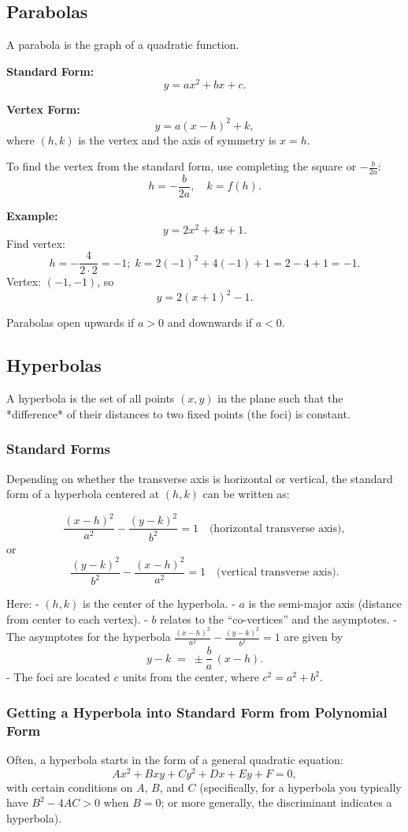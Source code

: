 \documentclass{article}
\begin{document}
\begin{multicols}{2}
\section*{Parabolas}
A parabola is the graph of a quadratic function.

\textbf{Standard Form:}
\[
y=ax^2+bx+c.
\]

\textbf{Vertex Form:}
\[
y=a(x-h)^2 + k,
\]
where \((h,k)\) is the vertex and the axis of symmetry is \(x=h\).

To find the vertex from the standard form, use completing the square or \(-\frac{b}{2a}\):
\[
h = -\frac{b}{2a}, \quad k = f(h).
\]

\textbf{Example:}
\[
y=2x^2+4x+1.
\]
Find vertex:
\[
h=-\frac{4}{2\cdot2}=-1; \; k=2(-1)^2+4(-1)+1=2-4+1=-1.
\]
Vertex: \((-1,-1)\), so
\[
y=2(x+1)^2 -1.
\]

Parabolas open upwards if \(a>0\) and downwards if \(a<0\).
\subsection*{Hyperbolas}

A hyperbola is the set of all points \((x,y)\) in the plane such that the *difference* of their distances to two fixed points (the foci) is constant. 

\subsubsection*{Standard Forms}

Depending on whether the transverse axis is horizontal or vertical, the standard form of a hyperbola centered at \((h,k)\) can be written as:

\[
\frac{(x - h)^2}{a^2} - \frac{(y - k)^2}{b^2} = 1 
\quad\text{(horizontal transverse axis)},
\]
or
\[
\frac{(y - k)^2}{b^2} - \frac{(x - h)^2}{a^2} = 1 
\quad\text{(vertical transverse axis)}.
\]

Here:
- \((h,k)\) is the center of the hyperbola.
- \(a\) is the semi-major axis (distance from center to each vertex).
- \(b\) relates to the “co-vertices” and the asymptotes.
- The asymptotes for the hyperbola 
  \(\tfrac{(x-h)^2}{a^2} - \tfrac{(y-k)^2}{b^2} = 1\) 
  are given by 
  \[
    y - k \;=\; \pm \frac{b}{a} \,(x - h).
  \]
- The foci are located \(c\) units from the center, where \(c^2 = a^2 + b^2\).

\subsubsection*{Getting a Hyperbola into Standard Form from Polynomial Form}
Often, a hyperbola starts in the form of a general quadratic equation:
\[
Ax^2 + Bxy + Cy^2 + Dx + Ey + F = 0,
\]
with certain conditions on \(A\), \(B\), and \(C\) (specifically, for a hyperbola you typically have \(B^2 - 4AC > 0\) when \(B=0\); or more generally, the discriminant indicates a hyperbola).


\end{multicols}
\end{document}
